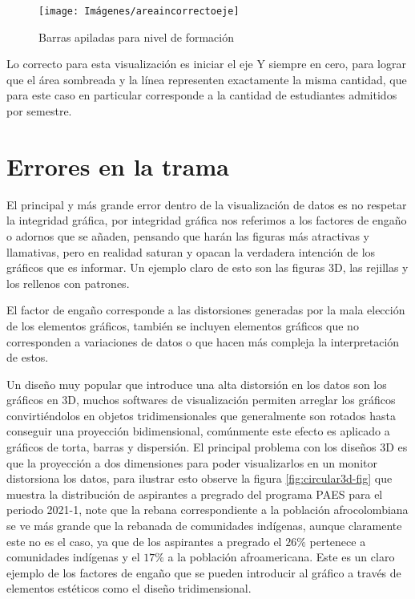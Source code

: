 \documentclass[
]{book}
\begin{document}
\begin{figure}

{\centering \texttt{[image: Imágenes/areaincorrectoeje]} 

}

\caption{Barras apiladas para nivel de formación}\label{fig:areasincorrecto-fig}
\end{figure}

Lo correcto para esta visualización es iniciar el eje Y siempre en cero, para lograr que el área sombreada y la línea representen exactamente la misma cantidad, que para este caso en particular corresponde a la cantidad de estudiantes admitidos por semestre.

\hypertarget{errores-en-la-trama}{%
\chapter{Errores en la trama}\label{errores-en-la-trama}}

El principal y más grande error dentro de la visualización de datos es no respetar la integridad gráfica, por integridad gráfica nos referimos a los factores de engaño o adornos que se añaden, pensando que harán las figuras más atractivas y llamativas, pero en realidad saturan y opacan la verdadera intención de los gráficos que es informar. Un ejemplo claro de esto son las figuras 3D, las rejillas y los rellenos con patrones.

El factor de engaño corresponde a las distorsiones generadas por la mala elección de los elementos gráficos, también se incluyen elementos gráficos que no corresponden a variaciones de datos o que hacen más compleja la interpretación de estos.

Un diseño muy popular que introduce una alta distorsión en los datos son los gráficos en 3D, muchos softwares de visualización permiten arreglar los gráficos convirtiéndolos en objetos tridimensionales que generalmente son rotados hasta conseguir una proyección bidimensional, comúnmente este efecto es aplicado a gráficos de torta, barras y dispersión. El principal problema con los diseños 3D es que la proyección a dos dimensiones para poder visualizarlos en un monitor distorsiona los datos, para ilustrar esto observe la figura \ref{fig:circular3d-fig} que muestra la distribución de aspirantes a pregrado del programa PAES para el periodo 2021-1, note que la rebana correspondiente a la población afrocolombiana se ve más grande que la rebanada de comunidades indígenas, aunque claramente este no es el caso, ya que de los aspirantes a pregrado el \(26\%\) pertenece a comunidades indígenas y el \(17\%\) a la población afroamericana. Este es un claro ejemplo de los factores de engaño que se pueden introducir al gráfico a través de elementos estéticos como el diseño tridimensional.
\end{document}
